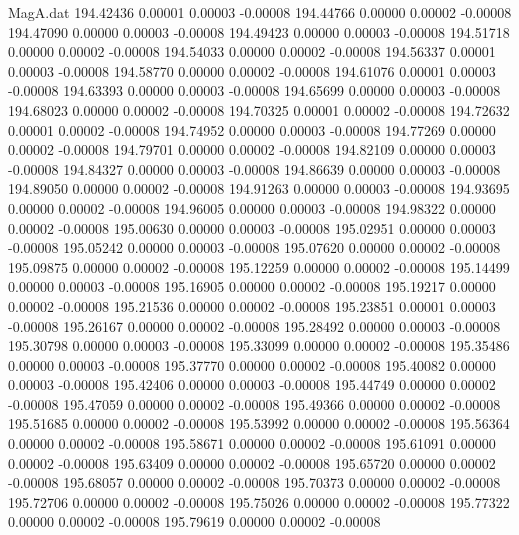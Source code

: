 \begin{filecontents}{MagA.dat}
 194.42436    0.00001    0.00003   -0.00008
 194.44766    0.00000    0.00002   -0.00008
 194.47090    0.00000    0.00003   -0.00008
 194.49423    0.00000    0.00003   -0.00008
 194.51718    0.00000    0.00002   -0.00008
 194.54033    0.00000    0.00002   -0.00008
 194.56337    0.00001    0.00003   -0.00008
 194.58770    0.00000    0.00002   -0.00008
 194.61076    0.00001    0.00003   -0.00008
 194.63393    0.00000    0.00003   -0.00008
 194.65699    0.00000    0.00003   -0.00008
 194.68023    0.00000    0.00002   -0.00008
 194.70325    0.00001    0.00002   -0.00008
 194.72632    0.00001    0.00002   -0.00008
 194.74952    0.00000    0.00003   -0.00008
 194.77269    0.00000    0.00002   -0.00008
 194.79701    0.00000    0.00002   -0.00008
 194.82109    0.00000    0.00003   -0.00008
 194.84327    0.00000    0.00003   -0.00008
 194.86639    0.00000    0.00003   -0.00008
 194.89050    0.00000    0.00002   -0.00008
 194.91263    0.00000    0.00003   -0.00008
 194.93695    0.00000    0.00002   -0.00008
 194.96005    0.00000    0.00003   -0.00008
 194.98322    0.00000    0.00002   -0.00008
 195.00630    0.00000    0.00003   -0.00008
 195.02951    0.00000    0.00003   -0.00008
 195.05242    0.00000    0.00003   -0.00008
 195.07620    0.00000    0.00002   -0.00008
 195.09875    0.00000    0.00002   -0.00008
 195.12259    0.00000    0.00002   -0.00008
 195.14499    0.00000    0.00003   -0.00008
 195.16905    0.00000    0.00002   -0.00008
 195.19217    0.00000    0.00002   -0.00008
 195.21536    0.00000    0.00002   -0.00008
 195.23851    0.00001    0.00003   -0.00008
 195.26167    0.00000    0.00002   -0.00008
 195.28492    0.00000    0.00003   -0.00008
 195.30798    0.00000    0.00003   -0.00008
 195.33099    0.00000    0.00002   -0.00008
 195.35486    0.00000    0.00003   -0.00008
 195.37770    0.00000    0.00002   -0.00008
 195.40082    0.00000    0.00003   -0.00008
 195.42406    0.00000    0.00003   -0.00008
 195.44749    0.00000    0.00002   -0.00008
 195.47059    0.00000    0.00002   -0.00008
 195.49366    0.00000    0.00002   -0.00008
 195.51685    0.00000    0.00002   -0.00008
 195.53992    0.00000    0.00002   -0.00008
 195.56364    0.00000    0.00002   -0.00008
 195.58671    0.00000    0.00002   -0.00008
 195.61091    0.00000    0.00002   -0.00008
 195.63409    0.00000    0.00002   -0.00008
 195.65720    0.00000    0.00002   -0.00008
 195.68057    0.00000    0.00002   -0.00008
 195.70373    0.00000    0.00002   -0.00008
 195.72706    0.00000    0.00002   -0.00008
 195.75026    0.00000    0.00002   -0.00008
 195.77322    0.00000    0.00002   -0.00008
 195.79619    0.00000    0.00002   -0.00008

\end{filecontents}
